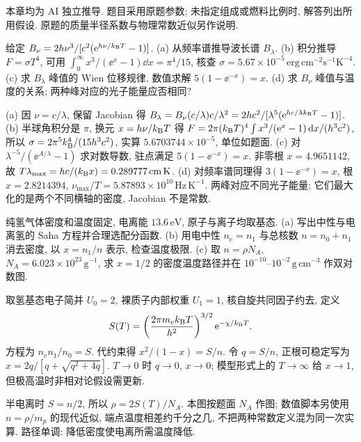 本章均为 AI 独立推导. 题目采用原题参数; 未指定组成或燃料比例时, 解答列出所用假设. 原题的质量半径系数与物理常数近似另作说明.

\begin{exercise}
给定 $B_\nu=2h\nu^3/[c^2(\mathrm e^{h\nu/k_{\mathrm B} T}-1)]$.
(a) 从频率谱推导波长谱 $B_\lambda$.
(b) 积分推导 $F=\sigma T^4$, 可用 $\int_0^\infty x^3/(\ee^x-1)\dd x=\pi^4/15$, 核查 $\sigma=5.67\times10^{-5}\,\mathrm{erg\,cm^{-2}s^{-1}K^{-4}}$.
(c) 求 $B_\lambda$ 峰值的 Wien 位移规律, 数值求解 $5(1-\ee^{-x})=x$.
(d) 求 $B_\nu$ 峰值与温度的关系; 两种峰对应的光子能量应否相同?
\end{exercise}
\begin{solution}
(a) 因 $\nu=c/\lambda$, 保留 Jacobian 得
$B_\lambda=B_\nu(c/\lambda)c/\lambda^2=2hc^2/[\lambda^5(\mathrm e^{hc/\lambda k_{\mathrm B} T}-1)]$.
(b) 半球角积分是 $\pi$, 换元 $x=h\nu/k_{\mathrm B} T$ 得 $F=2\pi(k_{\mathrm B} T)^4\int x^3/(\mathrm e^x-1)\,\mathrm d x/(h^3c^2)$, 所以 $\sigma=2\pi^5k_{\mathrm B}^4/(15h^3c^2)$, 实算 $5.6703744\times10^{-5}$, 单位如题面.
(c) 对 $\lambda^{-5}/(\ee^{A/\lambda}-1)$ 求对数导数, 驻点满足 $5(1-\ee^{-x})=x$. 非零根 $x=4.9651142$, 故 $T\lambda_{\max}=hc/(k_{\mathrm B} x)=0.289777\,\mathrm{cm\,K}$.
(d) 对频率谱同理得 $3(1-\ee^{-x})=x$, 根 $x=2.8214394$, $\nu_{\max}/T=5.87893\times10^{10}\,\mathrm{Hz\,K^{-1}}$. 两峰对应不同光子能量; 它们最大化的是两个不同横轴的密度, Jacobian 不是常数.
\end{solution}

\begin{exercise}
纯氢气体密度和温度固定, 电离能 $13.6\,\mathrm{eV}$, 原子与离子均取基态.
(a) 写出中性与电离氢的 Saha 方程并合理选配分函数.
(b) 用电中性 $n_e=n_1$ 与总核数 $n=n_0+n_1$ 消去密度, 以 $x=n_1/n$ 表示, 检查温度极限.
(c) 取 $n=\rho N_A$, $N_A=6.023\times10^{23}\,\mathrm{g^{-1}}$, 求 $x=1/2$ 的密度温度路径并在 $10^{-10}$--$10^{-2}\,\mathrm{g\,cm^{-3}}$ 作双对数图.
\end{exercise}
\begin{solution}
取氢基态电子简并 $U_0=2$, 裸质子内部权重 $U_1=1$, 核自旋共同因子约去, 定义\[S(T)=\left(\frac{2\pi m_ek_{\mathrm B} T}{h^2}\right)^{3/2}\mathrm e^{-\chi/k_{\mathrm B} T}.\] 方程为 $n_en_1/n_0=S$. 代约束得 $x^2/(1-x)=S/n$. 令 $q=S/n$, 正根可稳定写为 $x=2q/[q+\sqrt{q^2+4q}]$. $T\to0$ 时 $q\to0$, $x\to0$; 模型形式上的 $T\to\infty$ 给 $x\to1$, 但极高温时非相对论假设需更新.

半电离时 $S=n/2$, 所以 $\rho=2S(T)/N_A$. 本图按题面 $N_A$ 作图; 数值脚本另使用 $n=\rho/m_p$ 的现代近似, 端点温度相差约千分之几, 不把两种常数定义混为同一次实算. 路径单调: 降低密度使电离所需温度降低.
\begin{center}\end{center}
\end{solution}


